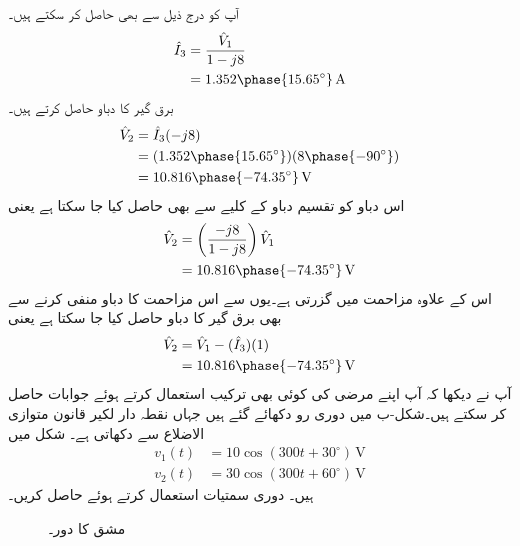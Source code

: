 آپ  کو درج ذیل سے بھی حاصل کر سکتے ہیں۔
\begin{align*}
\hat{I}_3&=\frac{\hat{V}_1}{1-j8}\\
&=1.352\phase{15.65^{\circ}}\,\si{\ampere}
\end{align*}
برق گیر کا دباو حاصل کرتے ہیں۔
\begin{align*}
\hat{V}_2&=\hat{I}_3 (-j8)\\
&=(1.352\phase{15.65^{\circ}})(8\phase{-90^{\circ}})\\
&=10.816\phase{-74.35^{\circ}}\,\si{\volt}
\end{align*}
اس دباو کو تقسیم دباو کے کلیے سے بھی حاصل کیا جا سکتا ہے یعنی
\begin{align*}
\hat{V}_2&=\left(\frac{-j8}{1-j8}\right) \hat{V}_1\\
&=10.816\phase{-74.35^{\circ}}\,\si{\volt}
\end{align*}
اس کے علاوہ   مزاحمت میں  گزرتی ہے۔یوں  سے اس مزاحمت کا دباو منفی کرنے سے بھی برق گیر کا دباو حاصل کیا جا سکتا ہے یعنی
\begin{align*}
\hat{V}_2&=\hat{V}_1-(\hat{I}_3)(1)\\
&=10.816\phase{-74.35^{\circ}}\,\si{\volt}
\end{align*}
آپ نے دیکھا کہ آپ اپنے مرضی کی کوئی بھی ترکیب استعمال کرتے ہوئے جوابات حاصل کر سکتے ہیں۔شکل-ب میں دوری رو دکھائے گئے ہیں جہاں نقطہ دار لکیر قانون متوازی الاضلاع سے  دکھاتی ہے۔
شکل  میں
\begin{align*}
v_1(t)&=10\cos(300t+30^{\circ}) \, \si{\volt}\\
v_2(t)&=30\cos(300t+60^{\circ})\,\si{\volt}
\end{align*}
ہیں۔ دوری سمتیات استعمال کرتے ہوئے  حاصل کریں۔
\begin{figure}
\centering
{}
\caption{مشق  کا دور۔}
\label{شکل_بدلتا_کرخوف_بدلتی_رو_الف}
\end{figure}

